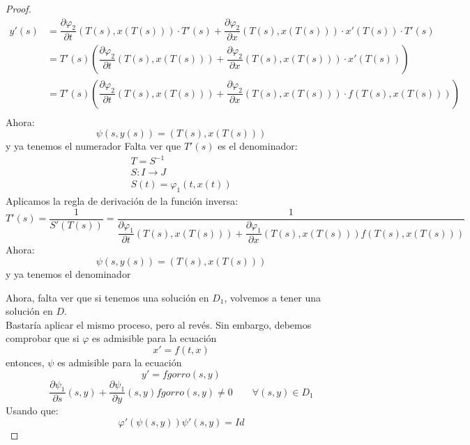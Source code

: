 \begin{proof}
    \begin{align*}
        y'(s) &= \dfrac{\partial\varphi_2}{\partial t}(T(s),x(T(s)))\cdot T'(s) + \dfrac{\partial \varphi_2}{\partial x}(T(s),x(T(s)))\cdot x'(T(s))\cdot T'(s) \\
              &= T'(s) \left(\dfrac{\partial\varphi_2}{\partial t}(T(s),x(T(s)))+ \dfrac{\partial \varphi_2}{\partial x}(T(s),x(T(s)))\cdot x'(T(s))\right) \\
              &= T'(s) \left(\dfrac{\partial\varphi_2}{\partial t}(T(s),x(T(s)))+ \dfrac{\partial \varphi_2}{\partial x}(T(s),x(T(s)))\cdot f(T(s),x(T(s)))\right) \\
    \end{align*}
    Ahora:
    \begin{equation*}
        \psi(s,y(s)) = (T(s), x(T(s)))
    \end{equation*}
    y ya tenemos el numerador
    Falta ver que $T'(s)$ es el denominador:
    \begin{gather*}
        T=S^{-1} \\
        S:I\rightarrow J \\
        S(t) = \varphi_1(t,x(t))
    \end{gather*}
    Aplicamos la regla de derivación de la función inversa:
    \begin{equation*}
        T'(s) = \dfrac{1}{S'(T(s))} =  \dfrac{1}{\dfrac{\partial\varphi_1}{\partial t}(T(s),x(T(s))) + \dfrac{\partial\varphi_1}{\partial x}(T(s),x(T(s)))f(T(s),x(T(s)))} 
    \end{equation*}
    Ahora:
    \begin{equation*}
        \psi(s,y(s)) = (T(s), x(T(s)))
    \end{equation*}
    y ya tenemos el denominador

    Ahora, falta ver que si tenemos una solución en $D_1$, volvemos a tener una solución en $D$.\\

    Bastaría aplicar el mismo proceso, pero al revés. Sin embargo, debemos comprobar que si $\varphi$ es admisible para la ecuación
    \begin{equation*}
        x'=f(t,x)
    \end{equation*}
    entonces, $\psi$ es admisible para la ecuación
    \begin{equation*}
        y' = fgorro(s,y)
    \end{equation*}
    \begin{equation*}
        \dfrac{\partial\psi_1}{\partial s}(s,y) + \dfrac{\partial\psi_1}{\partial y}(s,y)fgorro(s,y) \neq 0 \qquad \forall (s,y) \in  D_1
    \end{equation*}
    Usando que:
    \begin{equation*}
        \varphi'(\psi(s,y))\psi'(s,y) = Id
    \end{equation*}
\end{proof}

